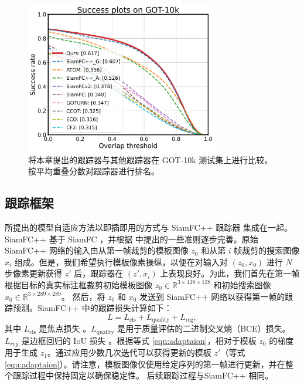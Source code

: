 \begin{figure}[t]
    \centering
    \includegraphics[width=0.75\textwidth]{Img/MTP/got10k/success_plot.png}
    \caption{将本章提出的跟踪器与其他跟踪器在 GOT-10k 测试集上进行比较。按平均重叠分数对跟踪器进行排名。}
    \label{fig:got10k}
\end{figure}

\subsection{跟踪框架}
所提出的模型自适应方法以即插即用的方式与 SiamFC++ 跟踪器 \cite{SiamFC++} 集成在一起。 SiamFC++ 基于 SiamFC \cite{SiamFC}，并根据 \cite{SiamFC++} 中提出的一些准则逐步完善。原始 SiamFC++ 网络的输入由从第一帧裁剪的模板图像 $z_0$ 和从第 $i$ 帧裁剪的搜索图像 $x_i$ 组成。但是，我们希望执行模板像素操纵，以便在对输入对 $(z_0, x_0)$ 进行 $N$ 步像素更新获得 $z'$ 后，跟踪器在 $(z', x_i)$ 上表现良好。为此，我们首先在第一帧根据目标的真实标注框裁剪初始模板图像 $z_0\in\mathbb R^{3\times128\times 128}$ 和初始搜索图像 $x_0\in\mathbb R^{3\times289\times 289}$。
然后，将 $z_0$ 和 $x_0$ 发送到 SiamFC++ 网络以获得第一帧的跟踪预测。SiamFC++ \cite{SiamFC++} 中的跟踪损失计算如下：
\begin{equation}
    L = L_{\text{cls}} + L_{\text{quality}} + L_{\text{reg}},
\end{equation}
其中 $L_{\text{cls}}$ 是焦点损失 \cite{focal}。$L_{\text{quality}}$ 是用于质量评估的二进制交叉熵（BCE）损失。$L_{reg}$ 是边框回归的 IoU 损失 \cite{yu2016unitbox}。根据等式 \ref{equ:adaptaion}，相对于模板 $z_0$ 的梯度用于生成 $z_1$。通过应用少数几次迭代可以获得更新的模板 $z'$（等式 \ref{equ:adaptaion}）。请注意，模板图像仅使用给定序列的第一帧进行更新，并在整个跟踪过程中保持固定以确保稳定性。
后续跟踪过程与SiamFC++ 相同。

